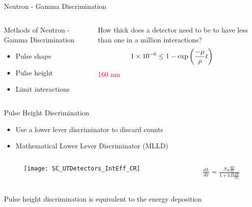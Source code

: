 \subsection*{}
\begin{frame}{Neutron - Gamma Discrimination}
  \begin{columns}[onlytextwidth]
    \begin{column}{0.45\textwidth}
    \large
    Methods of Neutron - Gamma Discrimination
    \normalsize
    \begin{itemize}
      \item Pulse shape 
      \item Pulse height
      \item Limit interactions
    \end{itemize}
    \end{column}
    \begin{column}{0.45\textwidth}
      How thick does a detector need to be to have less than one in a million interactions?
      \vspace{1cm}
      \begin{align*}
        \num{1E-6} &\le 1-\exp\left ( \frac{-\mu}{\rho}t \right )  
      \end{align*}
      \pause
      \huge
      \textcolor{red}{160 nm}
    \end{column}
  \end{columns}
\end{frame}
\begin{frame}[t]{Pulse Height Discrimination}
\label{PHDMain}
  \begin{itemize}
    \item Use a lower lever discriminator to discard counts
    \item Mathematical Lower Lever Discriminator (MLLD)
  \end{itemize}
  \begin{columns}[onlytextwidth]
    \begin{column}{0.7\textwidth}
      \begin{figure}
          \vspace*{-1cm}
          \texttt{[image: SC\_UTDetectors\_IntEff\_CR]}
      \end{figure}
    \end{column}
    \begin{column}{0.25\textwidth}
  \begin{align*}
    \frac{dL}{dx} = \frac{S_B\frac{dE}{dx}}{1+kB\frac{dE}{dx}}
  \end{align*}
    \end{column}
  \end{columns}
  Pulse height discrimination is equivalent to the energy deposition
\hyperlink{MeasMethods}{}
\end{frame}
